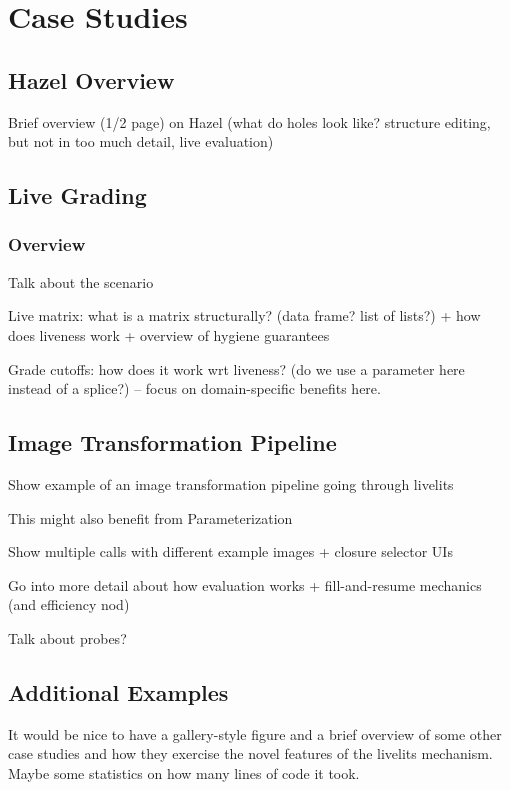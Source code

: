 \section{Case Studies}\label{sec:case-studies}
\subsection{Hazel Overview}\label{sec:hazel-overview}
Brief overview (1/2 page) on Hazel (what do holes look like? structure editing, but not in too much detail,
live evaluation)

\subsection{Live Grading}\label{sec:live-grading}
\subsubsection{Overview}\label{sec:live-grading-overview}
Talk about the scenario

Live matrix: what is a matrix structurally? (data frame? list of lists?) + how does liveness work
+ overview of hygiene guarantees

Grade cutoffs: how does it work wrt liveness? (do we use a parameter here instead of a splice?) -- 
focus on domain-specific benefits here.

\subsection{Image Transformation Pipeline}\label{sec:transformation}
Show example of an image transformation pipeline going through livelits

This might also benefit from Parameterization

Show multiple calls with different example images + closure selector UIs

Go into more detail about how evaluation works + fill-and-resume mechanics (and efficiency nod)

Talk about probes?

\subsection{Additional Examples}\label{sec:additional-examples}
It would be nice to have a gallery-style figure and a brief overview of some other case studies
and how they exercise the novel features of the livelits mechanism. Maybe some statistics on how
many lines of code it took.
